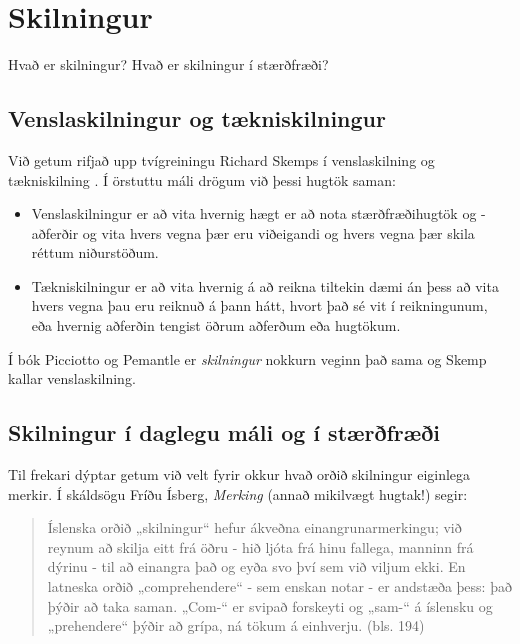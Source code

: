 \documentclass[
  icelandic,
]{book}
\providecommand{\tightlist}{%
  \setlength{\itemsep}{0pt}\setlength{\parskip}{0pt}}
\theoremstyle{definition}
\theoremstyle{definition}
\theoremstyle{definition}
\theoremstyle{definition}
\theoremstyle{remark}
\begin{document}
\chapter{Skilningur}\label{skilning}

Hvað er skilningur? Hvað er skilningur í stærðfræði?

\section{Venslaskilningur og tækniskilningur}\label{vensla-taekni}

Við getum rifjað upp tvígreiningu Richard Skemps í venslaskilning og tækniskilning \autocite{skemp1976}. Í örstuttu máli drögum við þessi hugtök saman:

\begin{itemize}
\tightlist
\item
  Venslaskilningur er að vita hvernig hægt er að nota stærðfræðihugtök og -aðferðir og vita hvers vegna þær eru viðeigandi og hvers vegna þær skila réttum niðurstöðum.
\item
  Tækniskilningur er að vita hvernig á að reikna tiltekin dæmi án þess að vita hvers vegna þau eru reiknuð á þann hátt, hvort það sé vit í reikningunum, eða hvernig aðferðin tengist öðrum aðferðum eða hugtökum.
\end{itemize}

Í bók Picciotto og Pemantle er \emph{skilningur} nokkurn veginn það sama og Skemp kallar venslaskilning.

\section{Skilningur í daglegu máli og í stærðfræði}\label{skiln-dag-stae}

Til frekari dýptar getum við velt fyrir okkur hvað orðið skilningur eiginlega merkir. Í skáldsögu Fríðu Ísberg, \emph{Merking} \autocite{isberg2021} (annað mikilvægt hugtak!) segir:

\begin{quote}
Íslenska orðið „skilningur`` hefur ákveðna einangrunarmerkingu; við reynum að skilja eitt frá öðru - hið ljóta frá hinu fallega, manninn frá dýrinu - til að einangra það og eyða svo því sem við viljum ekki. En latneska orðið „comprehendere`` - sem enskan notar - er andstæða þess: það þýðir að taka saman. „Com-`` er svipað forskeyti og „sam-`` á íslensku og „prehendere`` þýðir að grípa, ná tökum á einhverju. (bls. 194)
\end{quote}
\end{document}
